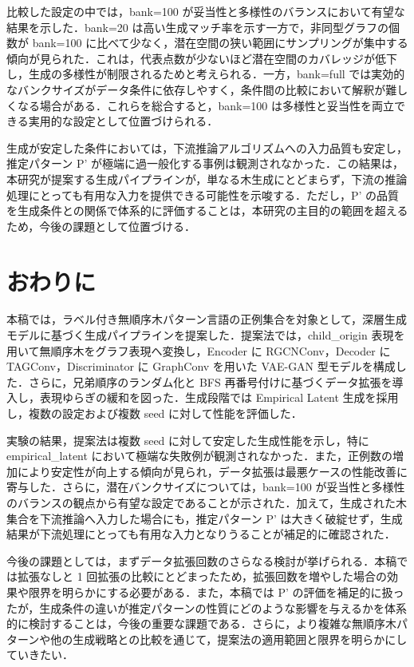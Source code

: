 \documentclass[submit,techrep,noauthor]{ipsj}
\begin{document}
比較した設定の中では，bank=100 が妥当性と多様性のバランスにおいて有望な結果を示した．bank=20 は高い生成マッチ率を示す一方で，非同型グラフの個数が bank=100 に比べて少なく，潜在空間の狭い範囲にサンプリングが集中する傾向が見られた．これは，代表点数が少ないほど潜在空間のカバレッジが低下し，生成の多様性が制限されるためと考えられる．一方，bank=full では実効的なバンクサイズがデータ条件に依存しやすく，条件間の比較において解釈が難しくなる場合がある．これらを総合すると，bank=100 は多様性と妥当性を両立できる実用的な設定として位置づけられる．


生成が安定した条件においては，下流推論アルゴリズムへの入力品質も安定し，推定パターン P' が極端に過一般化する事例は観測されなかった．この結果は，本研究が提案する生成パイプラインが，単なる木生成にとどまらず，下流の推論処理にとっても有用な入力を提供できる可能性を示唆する．ただし，P' の品質を生成条件との関係で体系的に評価することは，本研究の主目的の範囲を超えるため，今後の課題として位置づける．


\section{おわりに}

本稿では，ラベル付き無順序木パターン言語の正例集合を対象として，深層生成モデルに基づく生成パイプラインを提案した．提案法では，child\_origin 表現を用いて無順序木をグラフ表現へ変換し，Encoder に RGCNConv，Decoder に TAGConv，Discriminator に GraphConv を用いた VAE-GAN 型モデルを構成した．さらに，兄弟順序のランダム化と BFS 再番号付けに基づくデータ拡張を導入し，表現ゆらぎの緩和を図った．生成段階では Empirical Latent 生成を採用し，複数の設定および複数 seed に対して性能を評価した．

実験の結果，提案法は複数 seed に対して安定した生成性能を示し，特に empirical\_latent において極端な失敗例が観測されなかった．また，正例数の増加により安定性が向上する傾向が見られ，データ拡張は最悪ケースの性能改善に寄与した．さらに，潜在バンクサイズについては，bank=100 が妥当性と多様性のバランスの観点から有望な設定であることが示された．加えて，生成された木集合を下流推論へ入力した場合にも，推定パターン P' は大きく破綻せず，生成結果が下流処理にとっても有用な入力となりうることが補足的に確認された．

今後の課題としては，まずデータ拡張回数のさらなる検討が挙げられる．本稿では拡張なしと 1 回拡張の比較にとどまったため，拡張回数を増やした場合の効果や限界を明らかにする必要がある．また，本稿では P' の評価を補足的に扱ったが，生成条件の違いが推定パターンの性質にどのような影響を与えるかを体系的に検討することは，今後の重要な課題である．さらに，より複雑な無順序木パターンや他の生成戦略との比較を通じて，提案法の適用範囲と限界を明らかにしていきたい．
\end{document}
